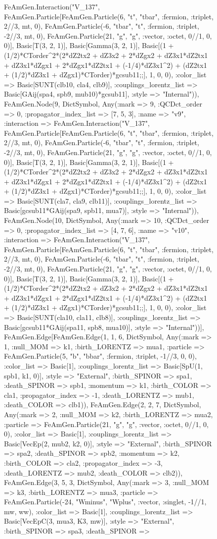 \documentclass{revtex4}
\begin{document}
\begin{figure}[!htb]
\begin{center}
{FeAmGen.Interaction("V_137", FeAmGen.Particle[FeAmGen.Particle(6, "t", "tbar", :fermion, :triplet, 2//3, mt, 0), FeAmGen.Particle(-6, "tbar", "t", :fermion, :triplet, -2//3, mt, 0), FeAmGen.Particle(21, "g", "g", :vector, :octet, 0//1, 0, 0)], Basic[T(3, 2, 1)], Basic[Gamma(3, 2, 1)], Basic[(1 + (1/2)*CTorder^2*(2*dZ2tx2 + dZ3x2 + 2*dZgx2 + dZ3x1*dZ2tx1 + dZ3x1*dZgx1 + 2*dZgx1*dZ2tx1 + (-1/4)*dZ3x1^2) + (dZ2tx1 + (1/2)*dZ3x1 + dZgx1)*CTorder)*gcsub11;;], 1, 0, 0), :color_list => Basic[SUNT(clb10, cla4, clb9)], :couplings_lorentz_list => Basic[GAij(spa4, spb9, mub10)*gcsub11], :style => "Internal")), FeAmGen.Node(9, Dict{Symbol, Any}(:mark => 9, :QCDct_order => 0, :propagator_index_list => [7, 5, 3], :name => "v9", :interaction => FeAmGen.Interaction("V_137", FeAmGen.Particle[FeAmGen.Particle(6, "t", "tbar", :fermion, :triplet, 2//3, mt, 0), FeAmGen.Particle(-6, "tbar", "t", :fermion, :triplet, -2//3, mt, 0), FeAmGen.Particle(21, "g", "g", :vector, :octet, 0//1, 0, 0)], Basic[T(3, 2, 1)], Basic[Gamma(3, 2, 1)], Basic[(1 + (1/2)*CTorder^2*(2*dZ2tx2 + dZ3x2 + 2*dZgx2 + dZ3x1*dZ2tx1 + dZ3x1*dZgx1 + 2*dZgx1*dZ2tx1 + (-1/4)*dZ3x1^2) + (dZ2tx1 + (1/2)*dZ3x1 + dZgx1)*CTorder)*gcsub11;;], 1, 0, 0), :color_list => Basic[SUNT(cla7, cla9, clb11)], :couplings_lorentz_list => Basic[gcsub11*GAij(spa9, spb11, mua7)], :style => "Internal")), FeAmGen.Node(10, Dict{Symbol, Any}(:mark => 10, :QCDct_order => 0, :propagator_index_list => [4, 7, 6], :name => "v10", :interaction => FeAmGen.Interaction("V_137", FeAmGen.Particle[FeAmGen.Particle(6, "t", "tbar", :fermion, :triplet, 2//3, mt, 0), FeAmGen.Particle(-6, "tbar", "t", :fermion, :triplet, -2//3, mt, 0), FeAmGen.Particle(21, "g", "g", :vector, :octet, 0//1, 0, 0)], Basic[T(3, 2, 1)], Basic[Gamma(3, 2, 1)], Basic[(1 + (1/2)*CTorder^2*(2*dZ2tx2 + dZ3x2 + 2*dZgx2 + dZ3x1*dZ2tx1 + dZ3x1*dZgx1 + 2*dZgx1*dZ2tx1 + (-1/4)*dZ3x1^2) + (dZ2tx1 + (1/2)*dZ3x1 + dZgx1)*CTorder)*gcsub11;;], 1, 0, 0), :color_list => Basic[SUNT(cla10, cla11, clb8)], :couplings_lorentz_list => Basic[gcsub11*GAij(spa11, spb8, mua10)], :style => "Internal"))], FeAmGen.Edge[FeAmGen.Edge(1, 1, 6, Dict{Symbol, Any}(:mark => 1, :null_MOM => k1, :birth_LORENTZ => mua1, :particle => FeAmGen.Particle(5, "b", "bbar", :fermion, :triplet, -1//3, 0, 0), :color_list => Basic[1], :couplings_lorentz_list => Basic[SpU(1, spb1, k1, 0)], :style => "External", :birth_SPINOR => spa1, :death_SPINOR => spb1, :momentum => k1, :birth_COLOR => cla1, :propagator_index => -1, :death_LORENTZ => mub1, :death_COLOR => clb1)), FeAmGen.Edge(2, 2, 7, Dict{Symbol, Any}(:mark => 2, :null_MOM => k2, :birth_LORENTZ => mua2, :particle => FeAmGen.Particle(21, "g", "g", :vector, :octet, 0//1, 0, 0), :color_list => Basic[1], :couplings_lorentz_list => Basic[VecEp(2, mub2, k2, 0)], :style => "External", :birth_SPINOR => spa2, :death_SPINOR => spb2, :momentum => k2, :birth_COLOR => cla2, :propagator_index => -3, :death_LORENTZ => mub2, :death_COLOR => clb2)), FeAmGen.Edge(3, 5, 3, Dict{Symbol, Any}(:mark => 3, :null_MOM => k3, :birth_LORENTZ => mua3, :particle => FeAmGen.Particle(-24, "Wminus", "Wplus", :vector, :singlet, -1//1, mw, ww), :color_list => Basic[1], :couplings_lorentz_list => Basic[VecEpC(3, mua3, K3, mw)], :style => "External", :birth_SPINOR => spa3, :death_SPINOR => }
\end{center}
\end{figure}
\end{document}
